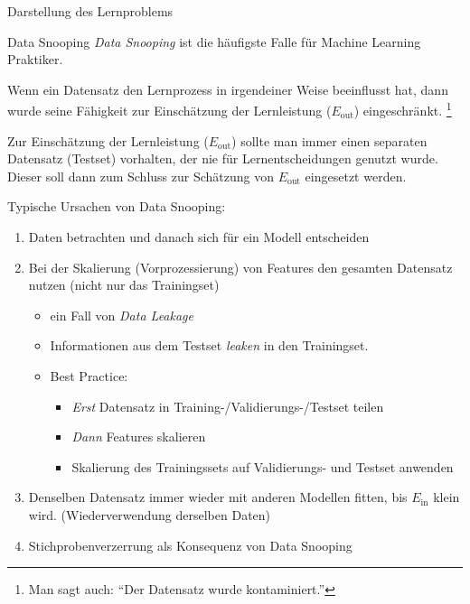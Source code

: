 \begin{bonus}{Darstellung des Lernproblems}

\end{bonus}

\begin{defi}{Data Snooping}
    \emph{Data Snooping} ist die häufigste Falle für Machine Learning Praktiker.

    Wenn ein Datensatz den Lernprozess in irgendeiner Weise beeinflusst hat, dann wurde seine Fähigkeit zur Einschätzung der Lernleistung ($E_\text{out}$) eingeschränkt.
    \footnote{
        Man sagt auch: \enquote{Der Datensatz wurde kontaminiert.}
    }

    Zur Einschätzung der Lernleistung ($E_\text{out}$) sollte man immer einen separaten Datensatz (Testset) vorhalten, der nie für Lernentscheidungen genutzt wurde.
    Dieser soll dann zum Schluss zur Schätzung von $E_\text{out}$ eingesetzt werden.

    Typische Ursachen von Data Snooping:
    \begin{enumerate}
        \item Daten betrachten und danach sich für ein Modell entscheiden
        \item Bei der Skalierung (Vorprozessierung) von Features den gesamten Datensatz nutzen (nicht nur das Trainingset)
              \begin{itemize}
                  \item ein Fall von \emph{Data Leakage}
                  \item Informationen aus dem Testset \emph{leaken} in den Trainingset.
                  \item Best Practice:
                        \begin{itemize}
                            \item \emph{Erst} Datensatz in Training-/Validierungs-/Testset teilen
                            \item \emph{Dann} Features skalieren
                            \item Skalierung des Trainingssets auf Validierungs- und Testset anwenden
                        \end{itemize}
              \end{itemize}
        \item Denselben Datensatz immer wieder mit anderen Modellen fitten, bis $E_\text{in}$ klein wird. (Wiederverwendung derselben Daten)
        \item Stichprobenverzerrung als Konsequenz von Data Snooping
    \end{enumerate}
\end{defi}

